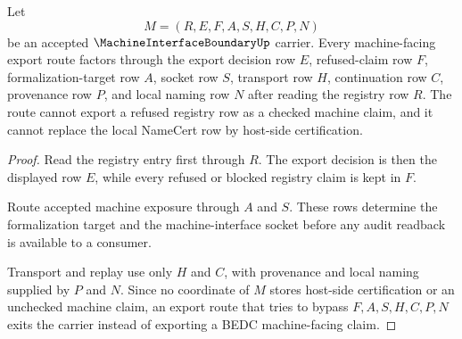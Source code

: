 \begin{theorem}
\label{thm:machine-interface-boundary-export-control}
Let
$$
M=(R,E,F,A,S,H,C,P,N)
$$
be an accepted $\MachineInterfaceBoundaryUp$ carrier. Every machine-facing export route factors through the export decision row $E$, refused-claim row $F$, formalization-target row $A$, socket row $S$, transport row $H$, continuation row $C$, provenance row $P$, and local naming row $N$ after reading the registry row $R$. The route cannot export a refused registry row as a checked machine claim, and it cannot replace the local NameCert row by host-side certification.
\end{theorem}
\begin{proof}
Read the registry entry first through $R$. The export decision is then the displayed row $E$, while every refused or blocked registry claim is kept in $F$.

Route accepted machine exposure through $A$ and $S$. These rows determine the formalization target and the machine-interface socket before any audit readback is available to a consumer.

Transport and replay use only $H$ and $C$, with provenance and local naming supplied by $P$ and $N$. Since no coordinate of $M$ stores host-side certification or an unchecked machine claim, an export route that tries to bypass $F,A,S,H,C,P,N$ exits the carrier instead of exporting a BEDC machine-facing claim.
\end{proof}

